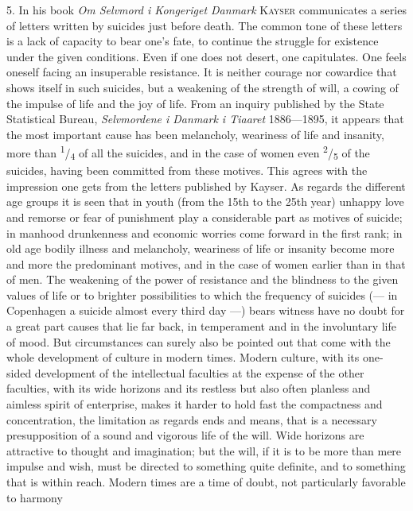 \documentclass[12pt,a4paper,openany]{book}
\newcommand{\opage}[1]{\marginnote{\footnotesize\textit{[#1]}}}
\begin{document}
5. In his book \textit{Om Selvmord i Kongeriget Danmark} \textsc{Kayser} communicates a series of letters written
by suicides just before death. The common tone of these letters is a lack of capacity to bear one's fate, to
continue the struggle for existence under the given conditions. Even if one does not desert, one capitulates.
One feels oneself facing an insuperable resistance. It is neither courage nor cowardice that shows itself in such
suicides, but a weakening of the strength of will, a cowing of the impulse of life and the joy of life. From an
inquiry published by the State Statistical Bureau, \textit{Selvmordene i Danmark i Tiaaret} 1886---1895, it
appears that the most important cause has been melancholy, weariness of life and insanity, more than
\textsuperscript{1}/\textsubscript{4} of all the suicides, and in the case of women even
\textsuperscript{2}/\textsubscript{5} of the suicides, having been committed from these motives. This agrees with
the impression one gets from the letters published by Kayser. As regards the different age groups it is seen
that in youth (from the 15th to the 25th year) unhappy love and remorse or fear of punishment play a considerable
part as motives of suicide; in manhood drunkenness and economic worries come forward in the first rank; in old
age bodily illness and melancholy, weariness of life or insanity become more and more the predominant motives,
and in the case of women earlier than in that of men. The weakening of the power of resistance and the blindness
to the given values of life or to brighter possibilities to which the frequency of suicides (--- in Copenhagen a
suicide almost every third day ---) bears witness have no doubt for a great part causes that lie far back, in
temperament and in the involuntary life of mood. But circumstances can surely also be pointed out that come with
the whole development of culture in modern times. Modern culture,
\opage{212}with its one-sided development of the intellectual faculties at the expense of the other faculties, with
its wide horizons and its restless but also often planless and aimless spirit of enterprise, makes it harder to
hold fast the compactness and concentration, the limitation as regards ends and means, that is a necessary
presupposition of a sound and vigorous life of the will. Wide horizons are attractive to thought and imagination;
but the will, if it is to be more than mere impulse and wish, must be directed to something quite definite, and
to something that is within reach. Modern times are a time of doubt, not particularly favorable to harmony
\end{document}
